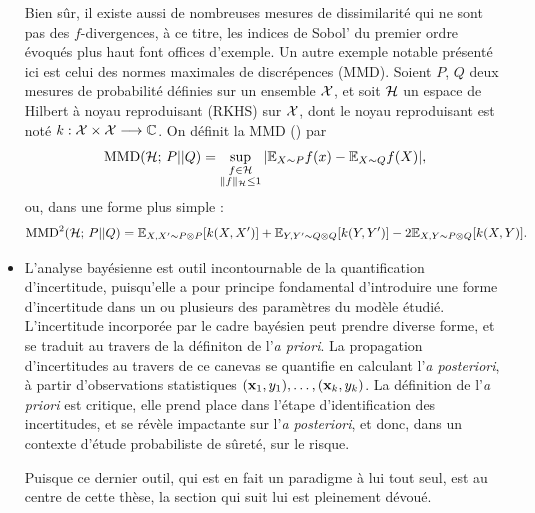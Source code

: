 \begin{itemize}
    Bien sûr, il existe aussi de nombreuses mesures de dissimilarité qui ne sont pas des $f$-divergences, à ce titre, les indices de Sobol' du premier ordre évoqués plus haut font offices d'exemple. Un autre exemple notable présenté ici est celui des normes maximales de discrépences (MMD). Soient $P$, $Q$ deux mesures de probabilité définies sur un ensemble $\mathcal{X}$, et soit $\mathcal{H}$ un espace de Hilbert à noyau reproduisant (RKHS) sur $\mathcal{X}$,  dont le noyau reproduisant est noté $k:\mathcal{X}\times\mathcal{X}\longrightarrow\mathbb{C}$. %
    On définit la MMD (\cite{gretton_kernel_2012}) par
        \begin{equation}
            \text{MMD}(\mathcal{H};\,P||Q) = \sup_{\substack{f\in\mathcal{H}\\ \|f\|_{\mathcal{H}}\leq1}} |\mathbb{E}_{X\sim P}f(x) - \mathbb{E}_{X\sim Q}f(X)|,
        \end{equation}
    ou, dans une forme plus simple :
        \begin{equation}
            \text{MMD}^2(\mathcal{H};\,P||Q) = \mathbb{E}_{X,X'\sim P\otimes P}[k(X,X')] + \mathbb{E}_{Y,Y'\sim Q\otimes Q}[k(Y,Y')] - 2\mathbb{E}_{X,Y\sim P\otimes Q}[k(X,Y)].
        \end{equation}
    \item L'analyse bayésienne est outil incontournable de la quantification d'incertitude, puisqu'elle a pour principe fondamental d'introduire une forme d'incertitude dans un ou plusieurs des paramètres du modèle étudié. 
    L'incertitude incorporée par le cadre bayésien peut prendre diverse forme, et se traduit au travers de la définiton de l'\emph{a priori}. 
    La propagation d'incertitudes au travers de ce canevas se quantifie en calculant l'\emph{a posteriori}, à partir d'observations statistiques $(\mathbf{x}_1,y_1),\dots,(\mathbf{x}_k, y_k)$.
    La définition de l'\emph{a priori} est critique, elle prend place dans l'étape d'identification des incertitudes, et se révèle impactante sur l'\emph{a posteriori}, et donc, dans un contexte d'étude probabiliste de sûreté, sur le risque.
    
    Puisque ce dernier outil, qui est en fait un paradigme à lui tout seul, est au centre de cette thèse, la section qui suit lui est pleinement dévoué.
\end{itemize}
















